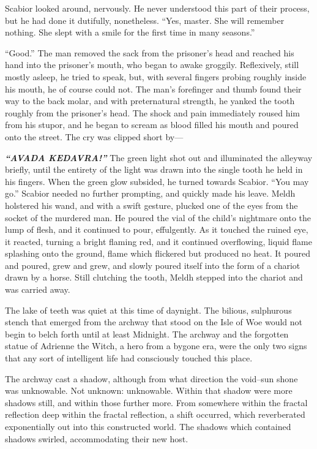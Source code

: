 Scabior looked around, nervously. He never understood this part of their process, but he had done it dutifully, nonetheless. “Yes, master. She will remember nothing. She slept with a smile for the first time in many seasons.”

“Good.” The man removed the sack from the prisoner’s head and reached his hand into the prisoner’s mouth, who began to awake groggily. Reflexively, still mostly asleep, he tried to speak, but, with several fingers probing roughly inside his mouth, he of course could not. The man’s forefinger and thumb found their way to the back molar, and with preternatural strength, he yanked the tooth roughly from the prisoner’s head. The shock and pain immediately roused him from his stupor, and he began to scream as blood filled his mouth and poured onto the street. The cry was clipped short by\mbox{---}

\emph{\textbf{“AVADA KEDAVRA!”}}
\SmallVSpace
The green light shot out and illuminated the alleyway briefly, until the entirety of the light was drawn into the single tooth he held in his fingers. When the green glow subsided, he turned towards Scabior. “You may go.”
\SmallVSpace
Scabior needed no further prompting, and quickly made his leave.
\SomeVSpace
Meldh holstered his wand, and with a swift gesture, plucked one of the eyes from the socket of the murdered man. He poured the vial of the child’s nightmare onto the lump of flesh, and it continued to pour, effulgently. As it touched the ruined eye, it reacted, turning a bright flaming red, and it continued overflowing, liquid flame splashing onto the ground, flame which flickered but produced no heat. It poured and poured, grew and grew, and slowly poured itself into the form of a chariot drawn by a horse. Still clutching the tooth, Meldh stepped into the chariot and was carried away.

\simpleline


The lake of teeth was quiet at this time of daynight. The bilious, sulphurous stench that emerged from the archway that stood on the Isle of Woe would not begin to belch forth until at least Midnight. The archway and the forgotten statue of Adrienne the Witch, a hero from a bygone era, were the only two signs that any sort of intelligent life had consciously touched this place.

The archway cast a shadow, although from what direction the void\mbox{--}sun shone was unknowable. Not unknown: unknowable. Within that shadow were more shadows still, and within those further more. From somewhere within the fractal reflection deep within the fractal reflection, a shift occurred, which reverberated exponentially out into this constructed world. The shadows which contained shadows swirled, accommodating their new host.

